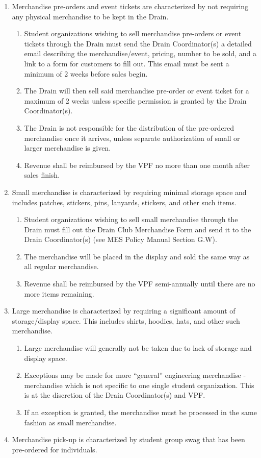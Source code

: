 \begin{enumerate}
 \item
  Merchandise pre-orders and event tickets are characterized by not requiring any physical merchandise to be kept in the Drain.

  \begin{enumerate}
   \item
    Student organizations wishing to sell merchandise pre-orders or event tickets through the Drain must send the Drain Coordinator(s) a detailed email describing the merchandise/event, pricing, number to be sold, and a link to a form for customers to fill out. This email must be sent a minimum of 2 weeks before sales begin.
   \item
    The Drain will then sell said merchandise pre-order or event ticket for a maximum of 2 weeks unless specific permission is granted by the Drain Coordinator(s).
   \item
    The Drain is not responsible for the distribution of the pre-ordered merchandise once it arrives, unless separate authorization of small or larger merchandise is given.
   \item
    Revenue shall be reimbursed by the VPF no more than one month after sales finish.
  \end{enumerate}
 \item
  Small merchandise is characterized by requiring minimal storage space and includes patches, stickers, pins, lanyards, stickers, and other such items.

  \begin{enumerate}
   \item
    Student organizations wishing to sell small merchandise through the Drain must fill out the Drain Club Merchandise Form and send it to the Drain Coordinator(s) (see MES Policy Manual Section G.W).
   \item
    The merchandise will be placed in the display and sold the same way as all regular merchandise.
   \item
    Revenue shall be reimbursed by the VPF semi-annually until there are no more items remaining.
  \end{enumerate}
 \item
  Large merchandise is characterized by requiring a significant amount of storage/display space. This includes shirts, hoodies, hats, and other such merchandise.

  \begin{enumerate}
   \item
    Large merchandise will generally not be taken due to lack of storage and display space.
   \item
    Exceptions may be made for more ``general'' engineering merchandise - merchandise which is not specific to one single student organization. This is at the discretion of the Drain Coordinator(s) and VPF.
   \item
    If an exception is granted, the merchandise must be processed in the same fashion as small merchandise.
  \end{enumerate}
  \item
  Merchandise pick-up is characterized by student group swag that has been pre-ordered for individuals.


\end{enumerate}
